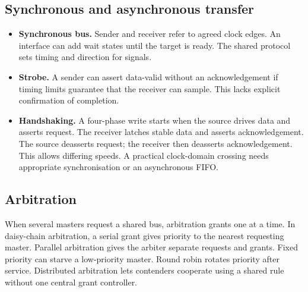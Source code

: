 \documentclass[12pt,a4paper]{article}
\begin{document}
\begin{tcolorbox}[tikzbox,title={CPU, main memory and the peripheral interface},unbreakable]
\centering
{}
\end{tcolorbox}

\subsection{Synchronous and asynchronous transfer}
\begin{itemize}[leftmargin=*,itemsep=3pt]
\item \textbf{Synchronous bus.} Sender and receiver refer to agreed clock edges. An interface can add wait states until the target is ready. The shared protocol sets timing and direction for signals.
\item \textbf{Strobe.} A sender can assert data-valid without an acknowledgement if timing limits guarantee that the receiver can sample. This lacks explicit confirmation of completion.
\item \textbf{Handshaking.} A four-phase write starts when the source drives data and asserts request. The receiver latches stable data and asserts acknowledgement. The source deasserts request; the receiver then deasserts acknowledgement. This allows differing speeds. A practical clock-domain crossing needs appropriate synchronisation or an asynchronous FIFO.
\end{itemize}
\subsection{Arbitration}
When several masters request a shared bus, arbitration grants one at a time. In daisy-chain arbitration, a serial grant gives priority to the nearest requesting master. Parallel arbitration gives the arbiter separate requests and grants. Fixed priority can starve a low-priority master. Round robin rotates priority after service. Distributed arbitration lets contenders cooperate using a shared rule without one central grant controller.
\end{document}
